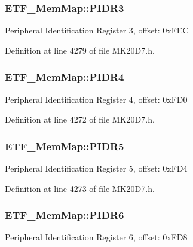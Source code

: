 \subsubsection[{\texorpdfstring{P\+I\+D\+R3}{PIDR3}}]{ E\+T\+F\+\_\+\+Mem\+Map\+::\+P\+I\+D\+R3}\hypertarget{struct_e_t_f___mem_map_a1132bf279f207a39e89f2fab3d384308}{}\label{struct_e_t_f___mem_map_a1132bf279f207a39e89f2fab3d384308}
Peripheral Identification Register 3, offset\+: 0x\+F\+EC 

Definition at line 4279 of file M\+K20\+D7.\+h.

\subsubsection[{\texorpdfstring{P\+I\+D\+R4}{PIDR4}}]{ E\+T\+F\+\_\+\+Mem\+Map\+::\+P\+I\+D\+R4}\hypertarget{struct_e_t_f___mem_map_a955a81d9c5e73e129ca965fa226bfde8}{}\label{struct_e_t_f___mem_map_a955a81d9c5e73e129ca965fa226bfde8}
Peripheral Identification Register 4, offset\+: 0x\+F\+D0 

Definition at line 4272 of file M\+K20\+D7.\+h.

\subsubsection[{\texorpdfstring{P\+I\+D\+R5}{PIDR5}}]{ E\+T\+F\+\_\+\+Mem\+Map\+::\+P\+I\+D\+R5}\hypertarget{struct_e_t_f___mem_map_a3054ae260a217f950e2c7793ff27855d}{}\label{struct_e_t_f___mem_map_a3054ae260a217f950e2c7793ff27855d}
Peripheral Identification Register 5, offset\+: 0x\+F\+D4 

Definition at line 4273 of file M\+K20\+D7.\+h.

\subsubsection[{\texorpdfstring{P\+I\+D\+R6}{PIDR6}}]{ E\+T\+F\+\_\+\+Mem\+Map\+::\+P\+I\+D\+R6}\hypertarget{struct_e_t_f___mem_map_a3448111767c72273ead546c08f49047b}{}\label{struct_e_t_f___mem_map_a3448111767c72273ead546c08f49047b}
Peripheral Identification Register 6, offset\+: 0x\+F\+D8 

